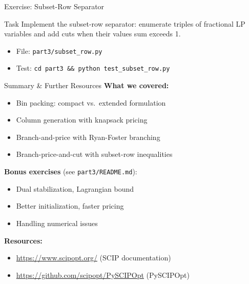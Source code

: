 \documentclass[aspectratio=169]{beamer}
\begin{document}
\begin{frame}{Exercise: Subset-Row Separator}
\begin{block}{Task}
Implement the subset-row separator: enumerate triples of fractional
LP variables and add cuts when their values sum exceeds 1.
\end{block}
\begin{itemize}
  \item File: \texttt{part3/subset\_row.py}
  \item Test: \texttt{cd part3 \&\& python test\_subset\_row.py}
\end{itemize}
\end{frame}

\begin{frame}{Summary \& Further Resources}
\textbf{What we covered:}
\begin{itemize}
  \item Bin packing: compact vs.\ extended formulation
  \item Column generation with knapsack pricing
  \item Branch-and-price with Ryan-Foster branching
  \item Branch-price-and-cut with subset-row inequalities
\end{itemize}

\medskip
\textbf{Bonus exercises} (see \texttt{part3/README.md}):
\begin{itemize}
  \item Dual stabilization, Lagrangian bound
  \item Better initialization, faster pricing
  \item Handling numerical issues
\end{itemize}

\medskip
\textbf{Resources:}
\begin{itemize}
  \item \url{https://www.scipopt.org/} (SCIP documentation)
  \item \url{https://github.com/scipopt/PySCIPOpt} (PySCIPOpt)
\end{itemize}
\end{frame}
\end{document}
